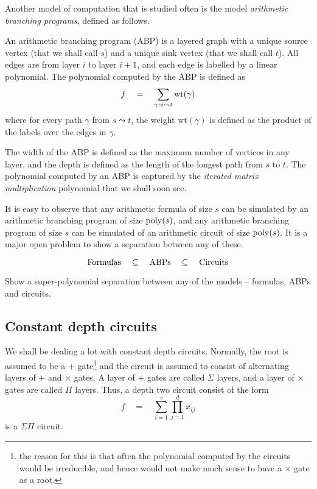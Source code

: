 Another model of computation that is studied often is the model \emph{arithmetic branching programs}, defined as follows. 

\begin{definition}\label{defn:ABP}
An arithmetic branching program (ABP) is a layered graph with a unique source vertex (that we shall call $s$) and a unique sink vertex (that we shall call $t$). All edges are from layer $i$ to layer $i+1$, and each edge is labelled by a linear polynomial. The polynomial computed by the ABP is defined as 
\[
f\quad = \quad \sum_{\gamma: s \leadsto t} \mathrm{wt}(\gamma)
\]
where for every path $\gamma$ from $s\leadsto t$, the weight $\mathrm{wt}(\gamma)$ is defined as the product of the labels over the edges in $\gamma$. 
\end{definition}

The width of the ABP is defined as the maximum number of vertices in any layer, and the depth is defined as the length of the longest path from $s$ to $t$. The polynomial computed by an ABP is captured by the \emph{iterated matrix multiplication} polynomial that we shall soon see. 

It is easy to observe that any arithmetic formula of size $s$ can be simulated by an arithmetic branching program of size $\mathrm{poly}(s)$, and any arithmetic branching program of size $s$ can be simulated of an arithmetic circuit of size $\mathrm{poly}(s)$. It is a major open problem to show a separation between any of these. 

\[
\mathrm{Formulas} \quad \subseteq \quad \mathrm{ABPs} \quad \subseteq \quad \mathrm{Circuits}
\]

\begin{openproblem}
Show a super-polynomial separation between any of the models -- formulas, ABPs and circuits. 
\end{openproblem}

\subsection{Constant depth circuits}

We shall be dealing a lot with constant depth circuits. Normally, the root is assumed to be a $+$ gate\footnote{the reason for this is that often the polynomial computed by the circuits would be irreducible, and hence would not make much sense to have a $\times$ gate as a root.} and the circuit is assumed to consist of alternating layers of $+$ and $\times$ gates. A layer of $+$ gates are called $\Sigma$ layers, and a layer of $\times$ gates are called $\Pi$ layers. Thus, a depth two circuit consist of the form 
\[
f\quad = \quad \sum_{i=1}^s \prod_{j=1}^d x_{ij}
\]
is a $\Sigma\Pi$ circuit. 

